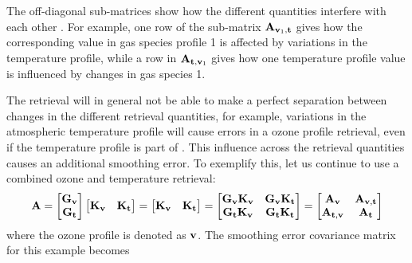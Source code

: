 The off-diagonal sub-matrices show how the different quantities interfere with
each other \citep{baron:studi:02}. For example, one row of the sub-matrix
$\mathbf{A}_{\mathbf{v}_1,\mathbf{t}}$ gives how the corresponding value in gas
species profile 1 is affected by variations in the temperature profile, while a
row in $\mathbf{A}_{\mathbf{t},\mathbf{v}_1}$ gives how one temperature profile
value is influenced by changes in gas species 1.

The retrieval will in general not be able to make a perfect separation between
changes in the different retrieval quantities, for example, variations in the
atmospheric temperature profile will cause errors in a ozone profile retrieval,
even if the temperature profile is part of \SttVct. This influence across the
retrieval quantities causes an additional smoothing error. To exemplify
this, let us continue to use a combined ozone and temperature retrieval:
\begin{displaymath}
  \mathbf{A}=  
  \begin{bmatrix}
    \mathbf{G}_{\mathbf{v}}\\\mathbf{G}_{\mathbf{t}}
  \end{bmatrix}
  \begin{bmatrix}
    \mathbf{K}_{\mathbf{v}} & \mathbf{K}_{\mathbf{t}}
  \end{bmatrix} =
  \begin{bmatrix}
    \mathbf{K}_{\mathbf{v}} & \mathbf{K}_{\mathbf{t}}
  \end{bmatrix} =
  \begin{bmatrix}
    \mathbf{G}_{\mathbf{v}}\mathbf{K}_{\mathbf{v}} &
    \mathbf{G}_{\mathbf{v}}\mathbf{K}_{\mathbf{t}} \\
    \mathbf{G}_{\mathbf{t}}\mathbf{K}_{\mathbf{v}} &
    \mathbf{G}_{\mathbf{t}}\mathbf{K}_{\mathbf{t}} \\
  \end{bmatrix} =
  \begin{bmatrix}
    \mathbf{A}_{\mathbf{v}} & \mathbf{A}_{\mathbf{v},\mathbf{t}} \\
    \mathbf{A}_{\mathbf{t},\mathbf{v}} & \mathbf{A}_{\mathbf{t}} 
  \end{bmatrix} 
\end{displaymath}
where the ozone profile is denoted as $\mathbf{v}$. The smoothing error
covariance matrix for this example becomes
